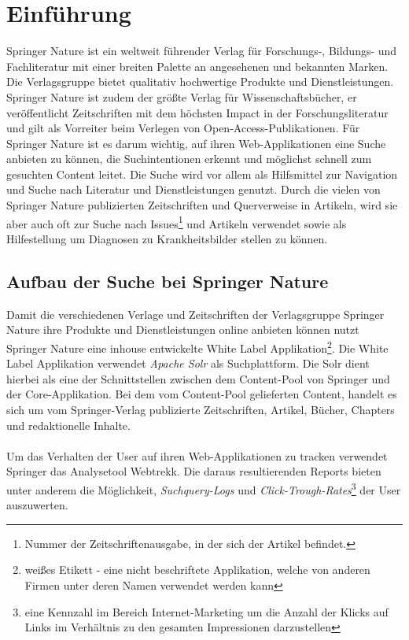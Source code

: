 %
\chapter{Einführung}
\label{sec:Einfuehrung}

Springer Nature ist ein weltweit führender Verlag für Forschungs-, Bildungs- und Fachliteratur mit einer breiten Palette an angesehenen und bekannten Marken. Die Verlagsgruppe bietet qualitativ hochwertige Produkte und Dienstleistungen. Springer Nature ist zudem der größte Verlag für Wissenschaftsbücher, er veröffentlicht Zeitschriften mit dem höchsten Impact in der Forschungsliteratur und gilt als Vorreiter beim Verlegen von Open-Access-Publikationen. Für Springer Nature ist es darum wichtig, auf ihren Web-Applikationen eine Suche anbieten zu können, die Suchintentionen erkennt und möglichst schnell zum gesuchten Content leitet. Die Suche wird vor allem als Hilfsmittel zur Navigation und Suche nach Literatur und Dienstleistungen genutzt. Durch die vielen von Springer Nature publizierten Zeitschriften und Querverweise in Artikeln, wird sie aber auch oft zur Suche nach Issues\footnote{Nummer der Zeitschriftenausgabe, in der sich der Artikel befindet.} und Artikeln verwendet sowie als Hilfestellung um Diagnosen zu Krankheitsbilder stellen zu können.

\section{Aufbau der Suche bei Springer Nature}
\label{sec:Einfuehrung:AufbauSucheBeiSpringerNature}

Damit die verschiedenen Verlage und Zeitschriften der Verlagsgruppe Springer Nature ihre Produkte und Dienstleistungen online anbieten können nutzt Springer Nature eine inhouse entwickelte White Label Applikation\footnote{\glqq weißes Etikett\grqq{} - eine nicht beschriftete Applikation, welche von anderen Firmen unter deren Namen verwendet werden kann}. Die White Label Applikation verwendet \textit{Apache Solr} als Suchplattform. Die Solr dient hierbei als eine der Schnittstellen zwischen dem Content-Pool von Springer und der Core-Applikation. Bei dem vom Content-Pool gelieferten Content, handelt es sich um vom Springer-Verlag publizierte Zeitschriften, Artikel, Bücher, Chapters und redaktionelle Inhalte.
\\
\\
Um das Verhalten der User auf ihren Web-Applikationen zu tracken verwendet Springer das Analysetool Webtrekk. Die daraus resultierenden Reports bieten unter anderem die Möglichkeit, \textit{Suchquery-Logs} und \textit{Click-Trough-Rates}\footnote{eine Kennzahl im Bereich Internet-Marketing um die Anzahl der Klicks auf Links im Verhältnis zu den gesamten Impressionen darzustellen} der User auszuwerten.


